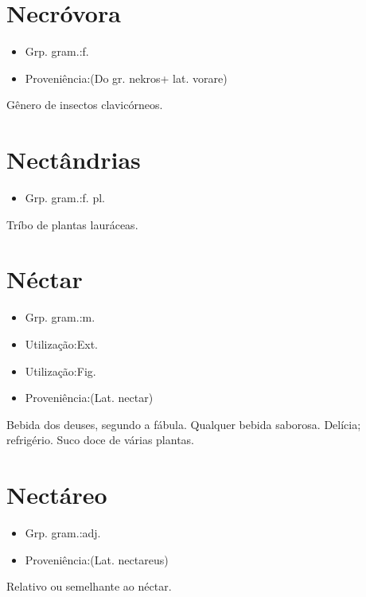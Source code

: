 \section{Necróvora}
\begin{itemize}
\item {Grp. gram.:f.}
\end{itemize}
\begin{itemize}
\item {Proveniência:(Do gr. \textunderscore nekros\textunderscore  + lat. \textunderscore vorare\textunderscore )}
\end{itemize}
Gênero de insectos clavicórneos.
\section{Nectândrias}
\begin{itemize}
\item {Grp. gram.:f. pl.}
\end{itemize}
Tríbo de plantas lauráceas.
\section{Néctar}
\begin{itemize}
\item {Grp. gram.:m.}
\end{itemize}
\begin{itemize}
\item {Utilização:Ext.}
\end{itemize}
\begin{itemize}
\item {Utilização:Fig.}
\end{itemize}
\begin{itemize}
\item {Proveniência:(Lat. \textunderscore nectar\textunderscore )}
\end{itemize}
Bebida dos deuses, segundo a fábula.
Qualquer bebida saborosa.
Delícia; refrigério.
Suco doce de várias plantas.
\section{Nectáreo}
\begin{itemize}
\item {Grp. gram.:adj.}
\end{itemize}
\begin{itemize}
\item {Proveniência:(Lat. \textunderscore nectareus\textunderscore )}
\end{itemize}
Relativo ou semelhante ao néctar.
